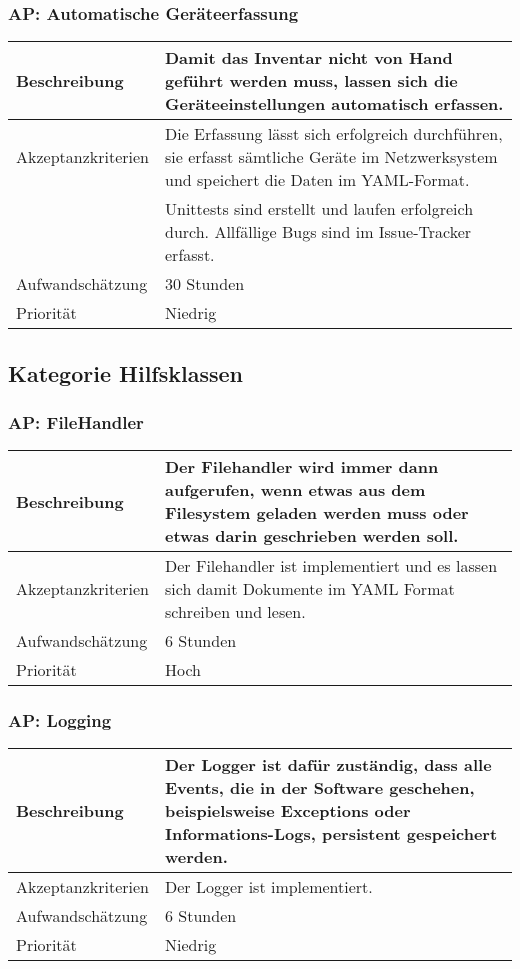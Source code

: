 \documentclass[
	ngerman,
	toc=listof, %
	toc=bibliography, %
	footnotes=multiple, %
	parskip=half, %
	numbers=noendperiod %
]{scrartcl}
\begin{document}
	\subsubsection{AP: Automatische Geräteerfassung}
	\begin{tabularx}{\textwidth}{lX}
		\toprule
		Beschreibung & Damit das Inventar nicht von Hand geführt werden muss, lassen sich die Geräteeinstellungen automatisch erfassen.\\
		\midrule
		Akzeptanzkriterien & Die Erfassung lässt sich erfolgreich durchführen, sie erfasst sämtliche Geräte im Netzwerksystem und speichert die Daten im YAML-Format.\\
		 & Unittests sind erstellt und laufen erfolgreich durch. Allfällige Bugs sind im Issue-Tracker erfasst.\\
		\midrule
		Aufwandschätzung & 30 Stunden\\
		\midrule
		Priorität & Niedrig\\
		\bottomrule
	\end{tabularx}
	\newpage

	\subsection{Kategorie Hilfsklassen}

	\subsubsection{AP: FileHandler}
	\begin{tabularx}{\textwidth}{lX}
		\toprule
		Beschreibung & Der Filehandler wird immer dann aufgerufen, wenn etwas aus dem Filesystem geladen werden muss oder etwas darin geschrieben werden soll.\\
		\midrule
		Akzeptanzkriterien & Der Filehandler ist implementiert und es lassen sich damit Dokumente im YAML Format schreiben und lesen.\\
		\midrule
		Aufwandschätzung & 6 Stunden\\
		\midrule
		Priorität & Hoch\\
		\bottomrule
	\end{tabularx}

	\subsubsection{AP: Logging}
	\begin{tabularx}{\textwidth}{lX}
		\toprule
		Beschreibung & Der Logger ist dafür zuständig, dass alle Events, die in der Software geschehen, beispielsweise Exceptions oder Informations-Logs, persistent gespeichert werden.\\
		\midrule
		Akzeptanzkriterien & Der Logger ist implementiert.\\
		\midrule
		Aufwandschätzung & 6 Stunden\\
		\midrule
		Priorität & Niedrig\\
		\bottomrule
	\end{tabularx}
\end{document}
